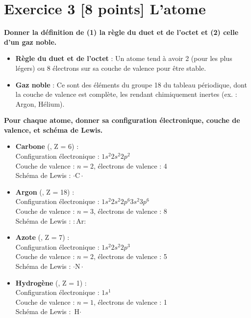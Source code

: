 \documentclass{exam}
\begin{document}
\section*{Exercice 3 [8 points] L'atome}

\begin{questions}

\question[1] \textbf{Donner la définition de (1) la règle du duet et de l'octet et (2) celle d'un gaz noble.}

\begin{itemize}
    \item \textbf{Règle du duet et de l'octet} : Un atome tend à avoir 2 (pour les plus légers) ou 8 électrons sur sa couche de valence pour être stable.
    \item \textbf{Gaz noble} : Ce sont des éléments du groupe 18 du tableau périodique, dont la couche de valence est complète, les rendant chimiquement inertes (ex. : Argon, Hélium).
\end{itemize}

\question[4] \textbf{Pour chaque atome, donner sa configuration électronique, couche de valence, et schéma de Lewis.}

\begin{itemize}
    \item \textbf{Carbone} (, Z = 6) :\\
    Configuration électronique : \( 1s^2 2s^2 2p^2 \)\\
    Couche de valence : \( n = 2 \), électrons de valence : 4\\
    Schéma de Lewis : \( \cdot \text{C} \cdot \)

    \item \textbf{Argon} (, Z = 18) :\\
    Configuration électronique : \( 1s^2 2s^2 2p^6 3s^2 3p^6 \)\\
    Couche de valence : \( n = 3 \), électrons de valence : 8\\
    Schéma de Lewis : \( :\text{Ar}: \)

    \item \textbf{Azote} (, Z = 7) :\\
    Configuration électronique : \( 1s^2 2s^2 2p^3 \)\\
    Couche de valence : \( n = 2 \), électrons de valence : 5\\
    Schéma de Lewis : \( \cdot \text{N} \cdot \)

    \item \textbf{Hydrogène} (, Z = 1) :\\
    Configuration électronique : \( 1s^1 \)\\
    Couche de valence : \( n = 1 \), électrons de valence : 1\\
    Schéma de Lewis : \( \text{H} \cdot \)


\end{itemize}
\end{questions}
\end{document}
